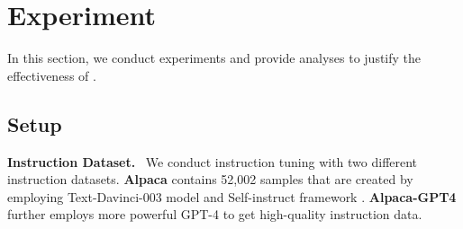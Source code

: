 \section{Experiment}
\label{section:experiment}

In this section, we conduct experiments and provide analyses to justify the effectiveness of \OURS.



\subsection{Setup}

\textbf{Instruction Dataset.}
\
We conduct instruction tuning with two different instruction datasets.
\textbf{Alpaca} \citep{alpaca} contains 52,002 samples that are created by employing Text-Davinci-003 model \citep{ouyang2022training} and Self-instruct framework \citep{wang-etal-2023-self-instruct}.
\textbf{Alpaca-GPT4} \citep{peng2023instructiontuninggpt4} further employs more powerful GPT-4 \citep{GPT-4} to get high-quality instruction data.



